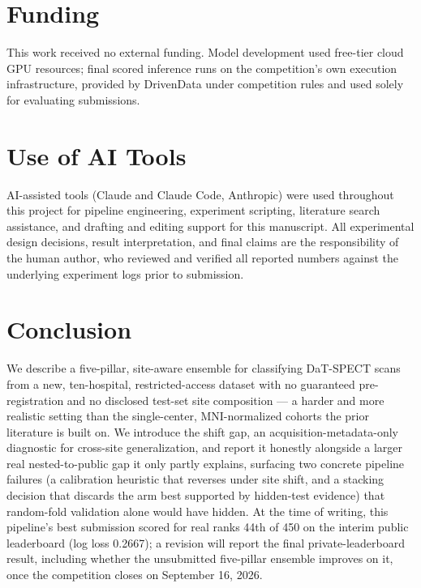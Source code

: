 \documentclass[11pt]{article}
\begin{document}
\section{Funding}
This work received no external funding. Model development used free-tier cloud GPU resources; final scored inference runs on the competition's own execution infrastructure, provided by DrivenData under competition rules and used solely for evaluating submissions.

\section{Use of AI Tools}
AI-assisted tools (Claude and Claude Code, Anthropic) were used throughout this project for pipeline engineering, experiment scripting, literature search assistance, and drafting and editing support for this manuscript. All experimental design decisions, result interpretation, and final claims are the responsibility of the human author, who reviewed and verified all reported numbers against the underlying experiment logs prior to submission.

\section{Conclusion}

We describe a five-pillar, site-aware ensemble for classifying DaT-SPECT scans from a new, ten-hospital, restricted-access dataset with no guaranteed pre-registration and no disclosed test-set site composition --- a harder and more realistic setting than the single-center, MNI-normalized cohorts the prior literature is built on. We introduce the shift gap, an acquisition-metadata-only diagnostic for cross-site generalization, and report it honestly alongside a larger real nested-to-public gap it only partly explains, surfacing two concrete pipeline failures (a calibration heuristic that reverses under site shift, and a stacking decision that discards the arm best supported by hidden-test evidence) that random-fold validation alone would have hidden. At the time of writing, this pipeline's best submission scored for real ranks 44th of 450 on the interim public leaderboard (log loss 0.2667); a revision will report the final private-leaderboard result, including whether the unsubmitted five-pillar ensemble improves on it, once the competition closes on September 16, 2026.
\end{document}
